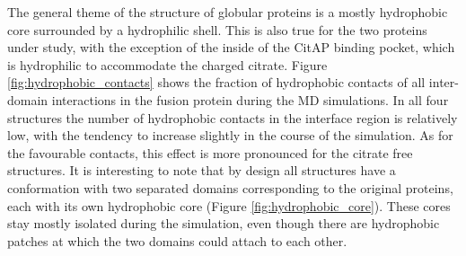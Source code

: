\documentclass[english, a4paper, 12pt, titlepage, draft]{article}
\begin{document}
The general theme of the structure of globular proteins is a mostly hydrophobic core surrounded by a hydrophilic shell.
This is also true for the two proteins under study, with the exception of the inside of the CitAP binding pocket, which is hydrophilic to accommodate the charged citrate.
Figure \ref{fig:hydrophobic_contacts} shows the fraction of hydrophobic contacts of all inter-domain interactions in the fusion protein during the MD simulations.
In all four structures the number of hydrophobic contacts in the interface region is relatively low, with the tendency to increase slightly in the course of the simulation.
As for the favourable contacts, this effect is more pronounced for the citrate free structures.
It is interesting to note that by design all structures have a conformation with two separated domains corresponding to the original proteins, each with its own hydrophobic core (Figure \ref{fig:hydrophobic_core}).
These cores stay mostly isolated during the simulation, even though there are hydrophobic patches at which the two domains could attach to each other.
\end{document}
